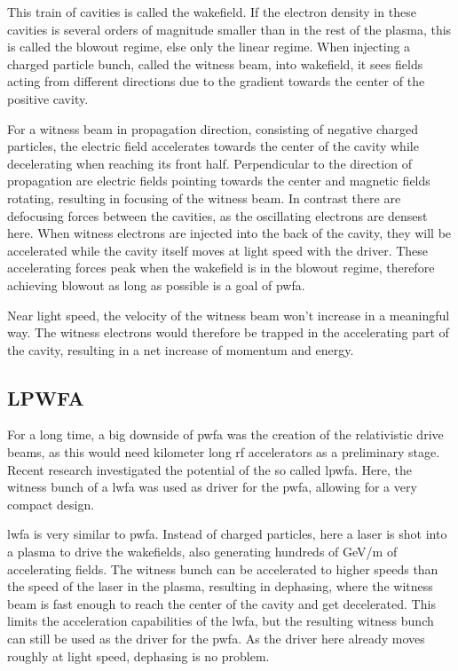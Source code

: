 \documentclass[bachelor_thesis]{subfiles}
\begin{document}
This train of cavities is called the wakefield. If the electron density in these cavities is several orders of magnitude smaller than in the rest of the plasma, this is called the blowout regime, else only the linear regime.
When injecting a charged particle bunch, called the witness beam, into wakefield, it sees fields acting from different directions due to the gradient towards the center of the positive cavity. 

For a witness beam in propagation direction, consisting of negative charged particles, the electric field accelerates towards the center of the cavity while decelerating when reaching its front half. 
Perpendicular to the direction of propagation are electric fields pointing towards the center and magnetic fields rotating, resulting in focusing of the witness beam. In contrast there are defocusing forces between the cavities, as the oscillating electrons are densest here.
When witness electrons are injected into the back of the cavity, they will be accelerated while the cavity itself moves at light speed with the driver.
These accelerating forces peak when the wakefield is in the blowout regime, therefore achieving blowout as long as possible is a goal of \gls{pwfa}.

Near light speed, the velocity of the witness beam won't increase in a meaningful way. The witness electrons would therefore be trapped in the accelerating part of the cavity, resulting in a net increase of momentum and energy.

\subsection{LPWFA} \label{chap:lpfwa}
For a long time, a big downside of \gls{pwfa} was the creation of the relativistic drive beams, as this would need kilometer long \gls{rf} accelerators as a preliminary stage. Recent research \cite{Kurz2021} investigated the potential of the so called \gls{lpwfa}.
Here, the witness bunch of a \gls{lwfa} was used as driver for the \gls{pwfa}, allowing for a very compact design.

\Gls{lwfa} is very similar to \gls{pwfa}. Instead of charged particles, here a laser is shot into a plasma to drive the wakefields, also generating hundreds of \unit{\GeV/\m} of accelerating fields.
The witness bunch can be accelerated to higher speeds than the speed of the laser in the plasma, resulting in dephasing, where the witness beam is fast enough to reach the center of the cavity and get decelerated. This limits the acceleration capabilities of the \gls{lwfa},
 but the resulting witness bunch can still be used as the driver for the \gls{pwfa}. As the driver here already moves roughly at light speed, dephasing is no problem. 
\end{document}
